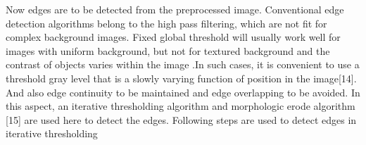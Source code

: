{{Now edges are to be detected from the preprocessed image. 
Conventional edge detection algorithms belong to the high 
pass filtering, which are not fit for complex background 
images. Fixed global threshold will usually work well for 
images with uniform background, but not for textured 
background and the contrast of objects varies within the image 
.In such cases, it is convenient to use a threshold gray level 
that is a slowly varying function of position in the image[14]. 
And also edge continuity to be maintained and edge 
overlapping to be avoided. In this aspect, an iterative 
thresholding algorithm and morphologic erode algorithm [15] 
are used here to detect the edges. Following steps are used to 
detect edges in iterative thresholding

}}
